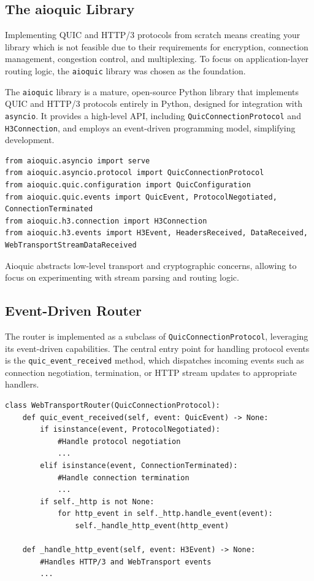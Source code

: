 \subsection{The aioquic Library}
Implementing QUIC and HTTP/3 protocols from scratch means creating your library which is not feasible due to their requirements for encryption, connection management, congestion control, and multiplexing. To focus on application-layer routing logic, the \texttt{aioquic} library was chosen as the foundation.

The \texttt{aioquic} library \cite{aioquic-repo} is a mature, open-source Python \cite{python-docs} library that implements QUIC and HTTP/3 protocols entirely in Python, designed for integration with \texttt{asyncio}. It provides a high-level API, including \texttt{QuicConnectionProtocol} and \texttt{H3Connection}, and employs an event-driven programming model, simplifying development.

\begin{lstlisting}[breaklines=true,basicstyle=\small\ttfamily,frame=single]
from aioquic.asyncio import serve
from aioquic.asyncio.protocol import QuicConnectionProtocol
from aioquic.quic.configuration import QuicConfiguration
from aioquic.quic.events import QuicEvent, ProtocolNegotiated, ConnectionTerminated
from aioquic.h3.connection import H3Connection
from aioquic.h3.events import H3Event, HeadersReceived, DataReceived, WebTransportStreamDataReceived
\end{lstlisting}

Aioquic abstracts low-level transport and cryptographic concerns, allowing to focus on experimenting with stream parsing and routing logic.

\subsection{Event-Driven Router}
The router is implemented as a subclass of \texttt{QuicConnectionProtocol}, leveraging its event-driven capabilities. The central entry point for handling protocol events is the \texttt{quic\_event\_received} method, which dispatches incoming events such as connection negotiation, termination, or HTTP stream updates to appropriate handlers.

\begin{lstlisting}[breaklines=true,basicstyle=\small\ttfamily,frame=single]
class WebTransportRouter(QuicConnectionProtocol):
    def quic_event_received(self, event: QuicEvent) -> None:
        if isinstance(event, ProtocolNegotiated):
            #Handle protocol negotiation
            ...
        elif isinstance(event, ConnectionTerminated):
            #Handle connection termination
            ...
        if self._http is not None:
            for http_event in self._http.handle_event(event):
                self._handle_http_event(http_event)

    def _handle_http_event(self, event: H3Event) -> None:
        #Handles HTTP/3 and WebTransport events
        ...
\end{lstlisting}

